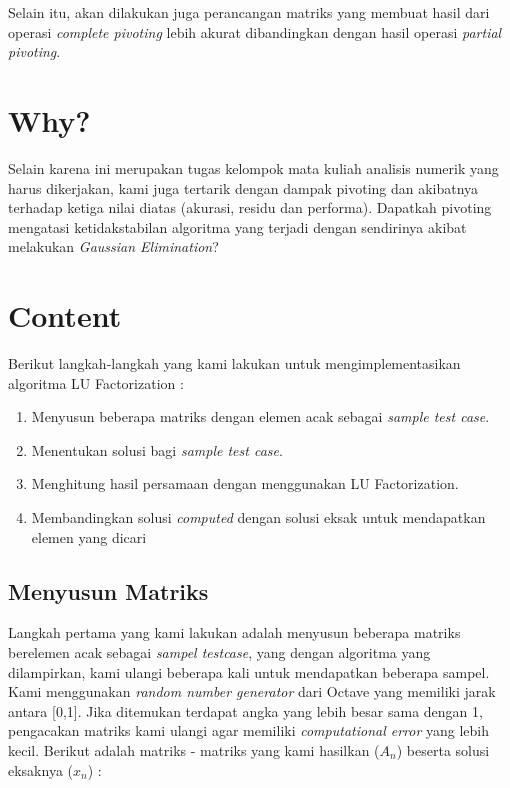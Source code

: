 \documentclass[11pt]{article}
\begin{document}
Selain itu, akan dilakukan juga perancangan matriks yang membuat hasil dari operasi \textit{complete pivoting} lebih akurat dibandingkan dengan hasil operasi \textit{partial pivoting}.

\section{Why?}
Selain karena ini merupakan tugas kelompok mata kuliah analisis numerik yang harus dikerjakan, kami juga tertarik dengan dampak pivoting dan akibatnya terhadap ketiga nilai diatas (akurasi, residu dan performa). Dapatkah pivoting mengatasi ketidakstabilan algoritma yang terjadi dengan sendirinya akibat melakukan \textit{Gaussian Elimination}? 

\section{Content}

Berikut langkah-langkah yang kami lakukan untuk mengimplementasikan algoritma LU Factorization :

\begin{enumerate}
    \item Menyusun beberapa matriks dengan elemen acak sebagai \textit{sample test case}.
    \item Menentukan solusi bagi \textit{sample test case}.
    \item Menghitung hasil persamaan dengan menggunakan LU Factorization.
    \item Membandingkan solusi \textit{computed} dengan solusi eksak untuk mendapatkan elemen yang dicari
\end{enumerate}

\subsection{Menyusun Matriks}
Langkah pertama yang kami lakukan adalah menyusun beberapa matriks berelemen acak sebagai \textit{sampel testcase}, yang dengan algoritma yang dilampirkan, kami ulangi beberapa kali untuk mendapatkan beberapa sampel. Kami menggunakan \textit{random number generator} dari Octave yang memiliki jarak antara [0,1]. Jika ditemukan terdapat angka yang lebih besar sama dengan 1, pengacakan matriks kami ulangi agar memiliki \textit{computational error} yang lebih kecil. Berikut adalah matriks - matriks yang kami hasilkan ($A_{n}$) beserta solusi eksaknya ($x_{n}$) :
\end{document}
